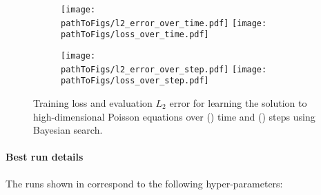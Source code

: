 \begin{figure}[!h]
  \centering
  \def\pathToFigs{kfac_pinns_exp/exp33_poisson_bayes_groupplot}
  \begin{subfigure}[t]{1.0\linewidth}
    \caption{}\label{subfig:poisson-bayes-time}
    \texttt{[image: \\pathToFigs/l2\_error\_over\_time.pdf]}
    \texttt{[image: \\pathToFigs/loss\_over\_time.pdf]}
  \end{subfigure}
  \begin{subfigure}[t]{1.0\linewidth}
    \caption{}\label{subfig:poisson-bayes-step}
    \texttt{[image: \\pathToFigs/l2\_error\_over\_step.pdf]}
    \texttt{[image: \\pathToFigs/loss\_over\_step.pdf]}
  \end{subfigure}
  \caption{Training loss and evaluation $L_2$ error for learning the solution to high-dimensional Poisson equations over () time and () steps using Bayesian search.}\label{fig:poisson-bayes-appendix}
\end{figure}

\paragraph{Best run details} The runs shown in  correspond to the following hyper-parameters:

